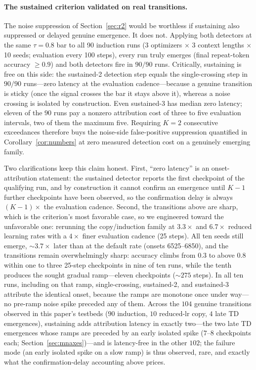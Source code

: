 \documentclass[11pt]{article}
\theoremstyle{plain}
\theoremstyle{definition}
\begin{document}
\paragraph{The sustained criterion validated on real transitions.} The noise suppression
of Section~\ref{sec:r2} would be worthless if sustaining also suppressed or delayed
genuine emergence. It does not. Applying both detectors at the same $\tau=0.8$ bar to all
90 induction runs (3 optimizers $\times$ 3 context lengths $\times$ 10 seeds; evaluation
every 100 steps), every run truly emerges (final repeat-token accuracy $\geq0.9$) and both
detectors fire in $90/90$ runs. Critically, sustaining is free on this side: the
sustained-2 detection step equals the single-crossing step in $90/90$ runs---zero
latency at the evaluation cadence---because a genuine transition is sticky (once the
signal crosses the bar it stays above it), whereas a noise crossing is isolated by
construction. Even sustained-3 has median zero latency; eleven of the $90$ runs pay a
nonzero attribution cost of three to five evaluation intervals, two of them the
maximum five. Requiring $K=2$ consecutive exceedances therefore buys the noise-side
false-positive suppression quantified in Corollary~\ref{cor:numbers} at zero measured
detection cost on a genuinely emerging family.

Two clarifications keep this claim honest. First, ``zero latency'' is an
onset-attribution statement: the sustained detector reports the first checkpoint of the
qualifying run, and by construction it cannot confirm an emergence until $K-1$
further checkpoints have been observed, so the confirmation delay is always
$(K{-}1)\times$ the evaluation cadence. Second, the transitions above are sharp, which
is the criterion's most favorable case, so we engineered toward the unfavorable one:
rerunning the copy/induction family at $3.3\times$ and $6.7\times$ reduced learning
rates with a $4\times$ finer evaluation cadence (25 steps). All ten seeds still emerge,
${\sim}3.7\times$ later than at the default rate (onsets 6525--6850), and the
transitions remain overwhelmingly sharp: accuracy climbs from $0.3$ to above $0.8$
within one to three 25-step checkpoints in nine of ten runs, while the tenth produces
the sought gradual ramp---eleven checkpoints (${\sim}275$ steps). In all ten runs,
including on that ramp, single-crossing, sustained-2, and sustained-3 attribute the
identical onset, because the ramps are monotone once under way---no pre-ramp noise
spike preceded any of them. Across the $104$ genuine transitions observed in this
paper's testbeds ($90$ induction, $10$ reduced-lr copy, $4$ late TD emergences),
sustaining adds attribution latency in exactly two---the two late TD emergences whose
ramps are preceded by an early isolated spike ($7$--$8$ checkpoints each;
Section~\ref{sec:mnaxes})---and is latency-free in the other $102$; the failure mode
(an early isolated spike on a slow ramp) is thus observed, rare, and exactly what
the confirmation-delay accounting above prices.
\end{document}
